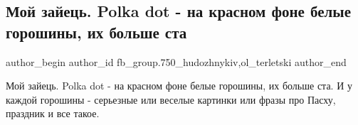  
 
 
 
 

\subsection{Мой зайець. Polka dot - на красном фоне белые горошины, их больше ста}
\label{sec:04_04_2018.fb.fb_group.750_hudozhnykiv.1.zajec_polka_dot}
 
\ifcmt
 author_begin
   author_id fb_group.750_hudozhnykiv,ol_terletski
 author_end
\fi

Мой зайець. Polka dot - на красном фоне белые горошины, их больше ста. И у
каждой горошины - серьезные или веселые картинки или фразы про Пасху, праздник
и все такое.

